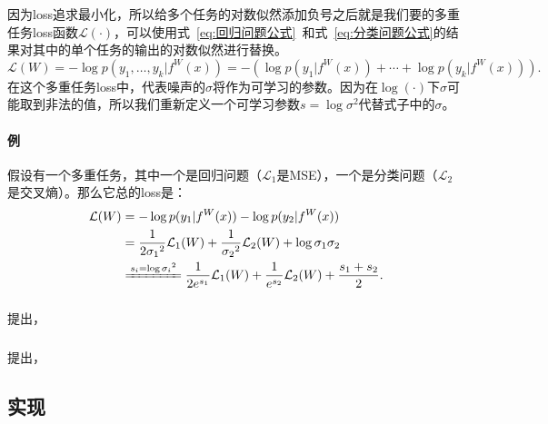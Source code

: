 \documentclass[a4paper,punct]{ctexart}
\begin{document}
因为loss追求最小化，所以给多个任务的对数似然添加负号之后就是我们要的多重任务loss函数$\mathcal{L}(\cdot)$，可以使用式~\ref{eq:回归问题公式}~和式~\ref{eq:分类问题公式}的结果对其中的单个任务的输出的对数似然进行替换。
\begin{equation}
    \mathcal{L}(W) = - \log p(y_1, \ldots, y_k|f^W(x)) = - (\log p(y_1 | f^W(x)) + \cdots + \log p(y_k | f^W(x))).
\end{equation}
在这个多重任务loss中，代表噪声的$\sigma$将作为可学习的参数。因为在$\log(\cdot)$下$\sigma$可能取到非法的值，所以我们重新定义一个可学习参数$s=\log \sigma^2$代替式子中的$\sigma$。

\paragraph{例} 假设有一个多重任务，其中一个是回归问题（$\mathcal{L}_1$是MSE），一个是分类问题（$\mathcal{L}_2$是交叉熵）。那么它总的loss是：
\begin{equation}
    \begin{aligned}
        \mathcal{L}(W) &= - \log p(y_1|f^W(x)) - \log p(y_2|f^W(x)) \\
         &= \frac{1}{2{\sigma_1}^2} \mathcal{L}_1(W) + \frac{1}{{\sigma_2}^2} \mathcal{L}_2(W) + \log \sigma_1\sigma_2 \\
         &\xlongequal{s_i =\log {\sigma_i}^2} \frac{1}{2{e}^{s_1}} \mathcal{L}_1(W) + \frac{1}{{e}^{s_2}} \mathcal{L}_2(W) + \frac{s_1 + s_2}{2}.
    \end{aligned}
\end{equation}

\subsubsection{}

\citet{Chen18GradNorm}提出，

\subsubsection{}

\citet{Sener18Pareto}提出，

\subsection{实现}

\subsubsection{}
\end{document}
